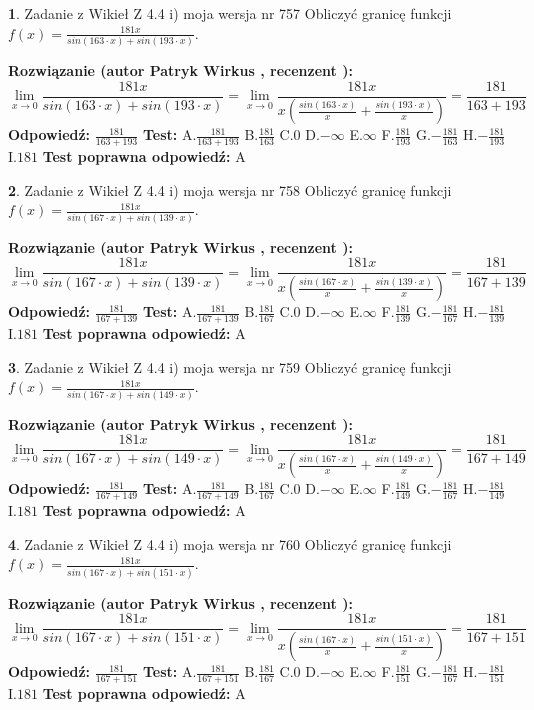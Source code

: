 \documentclass[12pt, a4paper]{article}
\theoremstyle{definition} %
\newtheorem{zad}{}
\newcommand{\zadStart}[1]{\begin{zad}#1\newline}
\newcommand{\zadStop}{\end{zad}}
\newcommand{\rozwStart}[2]{\noindent \textbf{Rozwiązanie (autor #1 , recenzent #2): }\newline}
\newcommand{\rozwStop}{\newline}
\newcommand{\odpStart}{\noindent \textbf{Odpowiedź:}\newline}
\newcommand{\odpStop}{\newline}
\newcommand{\testStart}{\noindent \textbf{Test:}\newline}
\newcommand{\testStop}{\newline}
\newcommand{\kluczStart}{\noindent \textbf{Test poprawna odpowiedź:}\newline}
\newcommand{\kluczStop}{\newline}
\begin{document}
\zadStart{Zadanie z Wikieł Z 4.4 i) moja wersja nr 757}
Obliczyć granicę funkcji $f(x)=\frac{181x}{sin(163\cdot x) +sin(193\cdot x)}$.
\zadStop
\rozwStart{Patryk Wirkus}{}
$$\lim\limits_{x\to 0}\frac{181x}{sin(163\cdot x) +sin(193\cdot x)}=\lim\limits_{x\to 0}\frac{181x}{x(\frac{sin(163\cdot x)}{x}+\frac{sin(193\cdot x)}{x})}=\frac{181}{163+193}$$
\rozwStop
\odpStart
$\frac{181}{163+193}$
\odpStop
\testStart
A.$\frac{181}{163+193}$
B.$\frac{181}{163}$
C.$0$
D.$-\infty$
E.$\infty$
F.$\frac{181}{193}$
G.$-\frac{181}{163}$
H.$-\frac{181}{193}$
I.$181$
\testStop
\kluczStart
A
\kluczStop



\zadStart{Zadanie z Wikieł Z 4.4 i) moja wersja nr 758}
Obliczyć granicę funkcji $f(x)=\frac{181x}{sin(167\cdot x) +sin(139\cdot x)}$.
\zadStop
\rozwStart{Patryk Wirkus}{}
$$\lim\limits_{x\to 0}\frac{181x}{sin(167\cdot x) +sin(139\cdot x)}=\lim\limits_{x\to 0}\frac{181x}{x(\frac{sin(167\cdot x)}{x}+\frac{sin(139\cdot x)}{x})}=\frac{181}{167+139}$$
\rozwStop
\odpStart
$\frac{181}{167+139}$
\odpStop
\testStart
A.$\frac{181}{167+139}$
B.$\frac{181}{167}$
C.$0$
D.$-\infty$
E.$\infty$
F.$\frac{181}{139}$
G.$-\frac{181}{167}$
H.$-\frac{181}{139}$
I.$181$
\testStop
\kluczStart
A
\kluczStop



\zadStart{Zadanie z Wikieł Z 4.4 i) moja wersja nr 759}
Obliczyć granicę funkcji $f(x)=\frac{181x}{sin(167\cdot x) +sin(149\cdot x)}$.
\zadStop
\rozwStart{Patryk Wirkus}{}
$$\lim\limits_{x\to 0}\frac{181x}{sin(167\cdot x) +sin(149\cdot x)}=\lim\limits_{x\to 0}\frac{181x}{x(\frac{sin(167\cdot x)}{x}+\frac{sin(149\cdot x)}{x})}=\frac{181}{167+149}$$
\rozwStop
\odpStart
$\frac{181}{167+149}$
\odpStop
\testStart
A.$\frac{181}{167+149}$
B.$\frac{181}{167}$
C.$0$
D.$-\infty$
E.$\infty$
F.$\frac{181}{149}$
G.$-\frac{181}{167}$
H.$-\frac{181}{149}$
I.$181$
\testStop
\kluczStart
A
\kluczStop



\zadStart{Zadanie z Wikieł Z 4.4 i) moja wersja nr 760}
Obliczyć granicę funkcji $f(x)=\frac{181x}{sin(167\cdot x) +sin(151\cdot x)}$.
\zadStop
\rozwStart{Patryk Wirkus}{}
$$\lim\limits_{x\to 0}\frac{181x}{sin(167\cdot x) +sin(151\cdot x)}=\lim\limits_{x\to 0}\frac{181x}{x(\frac{sin(167\cdot x)}{x}+\frac{sin(151\cdot x)}{x})}=\frac{181}{167+151}$$
\rozwStop
\odpStart
$\frac{181}{167+151}$
\odpStop
\testStart
A.$\frac{181}{167+151}$
B.$\frac{181}{167}$
C.$0$
D.$-\infty$
E.$\infty$
F.$\frac{181}{151}$
G.$-\frac{181}{167}$
H.$-\frac{181}{151}$
I.$181$
\testStop
\kluczStart
A
\kluczStop
\end{document}
